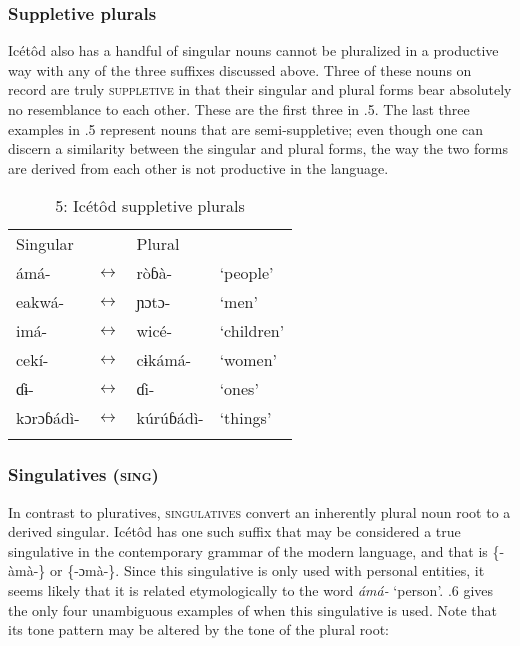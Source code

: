 \subsubsection{Suppletive plurals}

Icétôd also has a handful of singular nouns cannot be pluralized in a productive way with any of the three suffixes discussed above. Three of these nouns on record are truly \textsc{suppletive} in that their singular and plural forms bear absolutely no resemblance to each other. These are the first three in .5. The last three examples in .5 represent nouns that are semi-suppletive; even though one can discern a similarity between the singular and plural forms, the way the two forms are derived from each other is not productive in the language.  


\begin{table}
\caption{5: Icétôd suppletive plurals}
\label{tab:4}


\begin{tabularx}{\textwidth}{XXXX}
\lsptoprule

Singular &  & Plural & \\
ámá- & $\leftrightarrow $ & ròɓà- & ‘people’\\
eakwá- & $\leftrightarrow $ & ɲɔtɔ- & ‘men’\\
imá- & $\leftrightarrow $ & wicé- & ‘children’\\
cekí- & $\leftrightarrow $ & cɨkámá- & ‘women’\\
ɗɨ{}- & $\leftrightarrow $ & ɗi- & ‘ones’\\
kɔrɔɓádì- & $\leftrightarrow $ & kúrúɓádì- & ‘things’\\
\lspbottomrule
\end{tabularx}
\end{table}

\subsubsection{Singulatives (\textsc{sing})}

In contrast to pluratives, \textsc{singulatives} convert an inherently plural noun root to a derived singular. Icétôd has one such suffix that may be considered a true singulative in the contemporary grammar of the modern language, and that is \{-àmà-\} or \{-ɔmà-\}. Since this singulative is only used with personal entities, it seems likely that it is related etymologically to the word \textit{ámá- }‘person’. .6 gives the only four unambiguous examples of when this singulative is used. Note that its tone pattern may be altered by the tone of the plural root:


